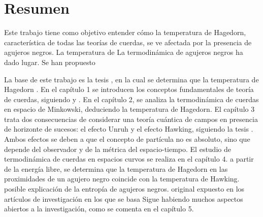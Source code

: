 \chapter*{Resumen}

Este trabajo tiene como objetivo entender cómo la temperatura de Hagedorn, 
característica de todas las teorías de cuerdas, se ve afectada por la presencia de agujeros
negros.
La temperatura de 
La termodinámica de agujeros negros ha  dado lugar.
Se han propuesto 

La base de este trabajo es la tesis \cite{Mertens2015}, en la cual se determina que la temperatura
de Hagedorn .
En el capítulo 1 se introducen los conceptos fundamentales de teoría de cuerdas, siguiendo \cite{Tong:2009np} y \cite{Mertens2015}. 
En el capítulo 2, se analiza la termodinámica de cuerdas en
espacio de Minkowski, deduciendo la temperatura de Hagedorn.
El capítulo 3 trata dos consecuencias de considerar una teoría cuántica de campos 
en presencia de horizonte de sucesos:  el efecto Unruh y el efecto Hawking, siguiendo la tesis \cite{Barbado:2015uua}.
Ambos efectos se deben a que el concepto de partícula no es absoluto, sino que
depende del observador y de la métrica del espacio-tiempo.
El estudio de termodinámica de cuerdas en espacios curvos se realiza en el capítulo 4.
a partir de la energía libre, se determina que la temperatura de Hagedorn en las proximidades
de un agujero negro coincide con la temperatura de Hawking.
posible explicación de la entropía de agujeros negros.
original expuesto en los artículos de investigación en los que se basa \cite{Mertens2015} 
Sigue habiendo muchos aspectos abiertos a la investigación, como se comenta en el capítulo 5.
